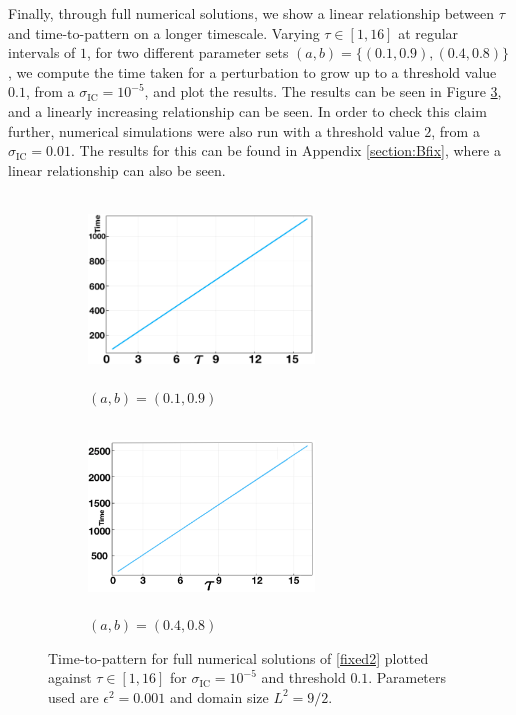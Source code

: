 Finally, through full numerical solutions, we show a linear relationship between $\tau$ and time-to-pattern on a longer timescale. Varying $\tau\in[1,16]$ at regular intervals of $1$, for two different parameter sets $(a,b)=\{(0.1,0.9),(0.4,0.8)\}$, we compute the time taken for a perturbation to grow up to a threshold value $0.1$, from a $\sigma_{\text{IC}}=10^{-5}$, and plot the results. The results can be seen in Figure \ref{fig:linperturb1}, and a linearly increasing relationship can be seen. In order to check this claim further, numerical simulations were also run with a threshold value $2$, from a $\sigma_{\text{IC}}=0.01$. The results for this can be found in Appendix \ref{section:Bfix}, where a linear relationship can also be seen.
\begin{figure}[H]
    \centering
    \begin{subfigure}[t]{0.45\textwidth}
        \centering
        \includegraphics[width=6cm,height=5cm]{longlin2.png}
        \caption{$(a,b)=(0.1,0.9)$}
        \label{fig:linperturb1a}
    \end{subfigure}
    \hfill
    \begin{subfigure}[t]{0.45\textwidth}
        \centering
        \includegraphics[width=6cm,height=5cm]{longlin3.png}
        \caption{$(a,b)=(0.4,0.8)$}
        \label{fig:linperturb1b}
    \end{subfigure}
    \caption{Time-to-pattern for full numerical solutions of \eqref{fixed2} plotted against $\tau\in[1,16]$ for $\sigma_{\text{IC}}=10^{-5}$ and threshold $0.1$. Parameters used are $\epsilon^2=0.001$ and domain size $L^2=9/2$.}
    \label{fig:linperturb1}
\end{figure}

